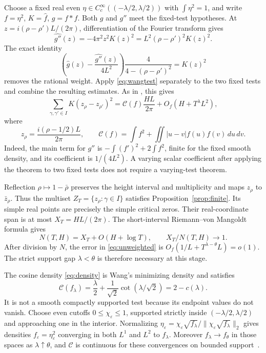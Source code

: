 \documentclass[11pt]{article}
\theoremstyle{remark}
\newcommand{\cC}{\mathcal C}
\begin{document}
Choose a fixed real even $\eta\in C_c^\infty((-\lambda/2,\lambda/2))$
with $\int\eta^2=1$, and write $f=\eta^2$, $K=\widehat f$, $g=f*f$.
Both $g$ and $g''$ meet the fixed-test hypotheses. At
$z=i(\rho-\rho')L/(2\pi)$, differentiation of the Fourier transform gives
\[
 \widehat {g''}(z)=-4\pi^2z^2K(z)^2
                  =L^2(\rho-\rho')^2K(z)^2.
\]
The exact identity
\[
 \left(\widehat g(z)-\frac{\widehat {g''}(z)}{4L^2}\right)
 \frac4{4-(\rho-\rho')^2}=K(z)^2
\]
removes the rational weight. Apply \eqref{eq:wangtest} separately to
the two fixed tests and combine the resulting estimates. As in
\cite[Lemma 3.1]{Wang}, this gives
\begin{equation}\label{eq:unweighted}
 \sum_{\gamma,\gamma'\in I}K(z_\rho-z_{\rho'})^2
 =\cC(f)\frac{HL}{2\pi}+O_f(H+T^\lambda L^2),
\end{equation}
where
\begin{equation}\label{eq:functional}
 z_\rho=\frac{i(\rho-1/2)L}{2\pi},\qquad
 \cC(f)=\int f^2+\iint|u-v|f(u)f(v)\,du\,dv.
\end{equation}
Indeed, the main term for $g''$ is
$-\int(f')^2+2\int f^2$, finite for the fixed smooth density, and its
coefficient is $1/(4L^2)$. A varying scalar coefficient after applying
the theorem to two fixed tests does not require a varying-test theorem.

Reflection $\rho\mapsto1-\bar\rho$ preserves the height interval and
multiplicity and maps $z_\rho$ to $\bar z_\rho$. Thus the multiset
$Z_T=\{z_\rho:\gamma\in I\}$ satisfies Proposition~\ref{prop:finite}.
Its simple real points are precisely the simple critical zeros. Their
real-coordinate span is at most $X_T=HL/(2\pi)$. The short-interval
Riemann--von Mangoldt formula gives
\begin{equation}\label{eq:normalization}
 N(T,H)=X_T+O(H+\log T),\qquad X_T/N(T,H)\longrightarrow1.
\end{equation}
After division by $N$, the error in \eqref{eq:unweighted} is
$O_f(1/L+T^{\lambda-\theta}L)=o(1)$. The strict support gap
$\lambda<\theta$ is therefore necessary at this stage.

The cosine density \eqref{eq:density} is Wang's minimizing density and
satisfies
\begin{equation}\label{eq:cost}
 \cC(f_\lambda)=\frac\lambda2+
         \frac1{\sqrt2}\cot(\lambda/\sqrt2)=2-c(\lambda).
\end{equation}
It is not a smooth compactly supported test because its endpoint values
do not vanish. Choose even cutoffs $0\le\chi_\varepsilon\le1$, supported
strictly inside $(-\lambda/2,\lambda/2)$ and approaching one in the
interior. Normalizing $\eta_\varepsilon=\chi_\varepsilon\sqrt{f_\lambda}/
\|\chi_\varepsilon\sqrt{f_\lambda}\|_2$ gives densities
$f_\varepsilon=\eta_\varepsilon^2$ converging in both $L^1$ and $L^2$
to $f_\lambda$. Moreover $f_\lambda\to f_\theta$ in those spaces as
$\lambda\uparrow\theta$, and $\cC$ is continuous for these convergences
on bounded support~\cite[Section 4]{Wang}.
\end{document}
